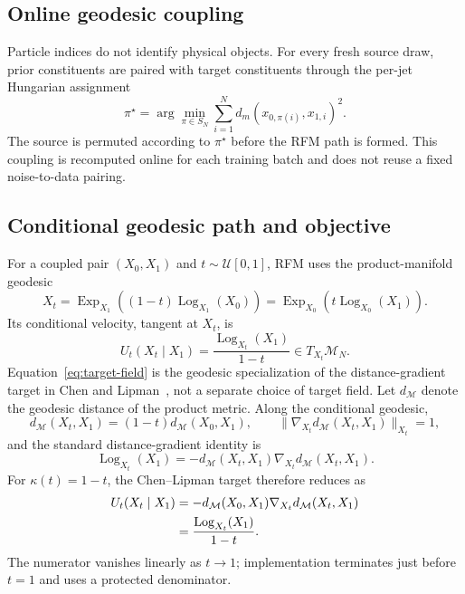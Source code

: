 \documentclass[10pt]{article}
\newcommand{\Exp}{\operatorname{Exp}}
\newcommand{\Log}{\operatorname{Log}}
\newcommand{\dist}{d_m}
\begin{document}
\subsection{Online geodesic coupling}

Particle indices do not identify physical objects. For every fresh source draw,
prior constituents are paired with target constituents through the per-jet
Hungarian assignment
\begin{equation}
 \pi^\star=\arg\min_{\pi\in S_N}\sum_{i=1}^N\dist(x_{0,\pi(i)},x_{1,i})^2.
 \label{eq:icp}
\end{equation}
The source is permuted according to $\pi^\star$ before the RFM path is formed.
This coupling is recomputed online for each training batch and does not reuse a
fixed noise-to-data pairing.

\subsection{Conditional geodesic path and objective}

For a coupled pair $(X_0,X_1)$ and $t\sim\mathcal{U}[0,1]$, RFM uses the
product-manifold geodesic
\begin{equation}
 X_t=\Exp_{X_1}\!\left((1-t)\Log_{X_1}(X_0)\right)
 =\Exp_{X_0}\!\left(t\Log_{X_0}(X_1)\right).
 \label{eq:rfm-path}
\end{equation}
Its conditional velocity, tangent at $X_t$, is
\begin{equation}
U_t(X_t\mid X_1)=\frac{\Log_{X_t}(X_1)}{1-t}\in T_{X_t}\mathcal{M}_N.
\label{eq:target-field}
\end{equation}
Equation~\eqref{eq:target-field} is the geodesic specialization of the
distance-gradient target in Chen and Lipman~\cite[Eqs.~(13)--(15)]{chen2023flow},
not a separate choice of target field.  Let $d_{\mathcal{M}}$ denote the geodesic
distance of the product metric.  Along the conditional geodesic,
\begin{equation}
 d_{\mathcal{M}}(X_t,X_1)=(1-t)d_{\mathcal{M}}(X_0,X_1),\qquad
 \|\nabla_{X_t}d_{\mathcal{M}}(X_t,X_1)\|_{X_t}=1,
 \label{eq:geodesic-distance-identities}
\end{equation}
and the standard distance-gradient identity is
\begin{equation}
 \Log_{X_t}(X_1)=-d_{\mathcal{M}}(X_t,X_1)
 \nabla_{X_t}d_{\mathcal{M}}(X_t,X_1).
 \label{eq:log-distance-gradient}
\end{equation}
For $\kappa(t)=1-t$, the Chen--Lipman target therefore reduces as
\begin{align}
 U_t(X_t\mid X_1)
 &=-d_{\mathcal{M}}(X_0,X_1)\nabla_{X_t}d_{\mathcal{M}}(X_t,X_1) \notag\\
 &=\frac{\Log_{X_t}(X_1)}{1-t}.
 \label{eq:target-field-derivation}
\end{align}
The numerator vanishes linearly as $t\to1$; implementation terminates just before
$t=1$ and uses a protected denominator.
\end{document}
